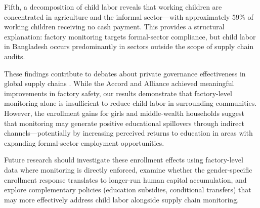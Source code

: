 \documentclass[12pt]{article}
\begin{document}
Fifth, a decomposition of child labor reveals that working children are concentrated in agriculture and the informal sector---with approximately 59\% of working children receiving no cash payment. This provides a structural explanation: factory monitoring targets formal-sector compliance, but child labor in Bangladesh occurs predominantly in sectors outside the scope of supply chain audits.

These findings contribute to debates about private governance effectiveness in global supply chains \citep{Locke2007, DistelhorstLocke2018}. While the Accord and Alliance achieved meaningful improvements in factory safety, our results demonstrate that factory-level monitoring alone is insufficient to reduce child labor in surrounding communities. However, the enrollment gains for girls and middle-wealth households suggest that monitoring may generate positive educational spillovers through indirect channels---potentially by increasing perceived returns to education in areas with expanding formal-sector employment opportunities.

Future research should investigate these enrollment effects using factory-level data where monitoring is directly enforced, examine whether the gender-specific enrollment response translates to longer-run human capital accumulation, and explore complementary policies (education subsidies, conditional transfers) that may more effectively address child labor alongside supply chain monitoring.



\end{document}

